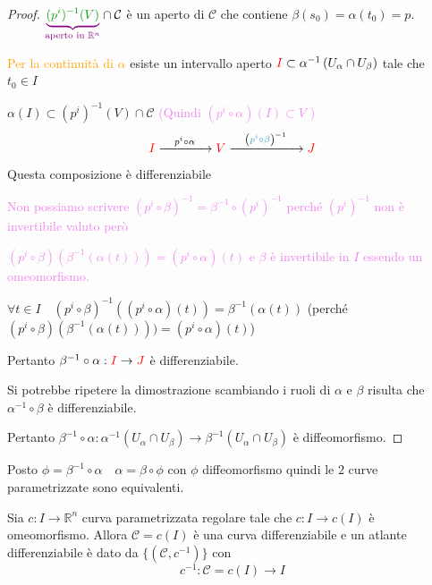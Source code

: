 \begin{proof}
        $\textcolor{violet}{\underbrace{\textcolor{verde}{(p^i)^{-1}(V)}}_{\text{aperto in } \mathbb{R}^n}} \cap \mathcal{C}$ è un aperto di $\mathcal{C}$ che contiene $\beta(s_0)=\alpha(t_0)=p$.

        \textcolor{orange}{Per la continuità di $\alpha$} esiste un intervallo aperto $\textcolor{red}{I} \subset \alpha^{-1} \left(U_\alpha \cap U_\beta \right)$ tale che
        $t_0 \in I$
        
        $\alpha(I) \subset (p^i)^{-1}(V) \cap \mathcal{C}$ \textcolor{violet}{(Quindi $\left(p^i \circ \alpha \right)(I) \subset V$ )}
        \[ \textcolor{red}{I} \xrightarrow[]{\quad p^i \circ \alpha \quad} \textcolor{red}{V} \xrightarrow[]{\quad \left( \textcolor{celeste}{p^i \circ \beta} \right)^{-1} \quad} \textcolor{red}{J} \]
        Questa composizione è differenziabile 

        \textcolor{violet}{Non possiamo scrivere $\left(p^i \circ \beta \right)^{-1} = \beta^{-1} \circ (p^i)^{-1}$ perché $(p^i)^{-1}$ non è 
        invertibile valuto però} 
        
        \textcolor{violet}{$(p^i \circ \beta)(\beta^{-1}(\alpha(t)))= (p^i \circ \alpha)(t)$ e $\beta$ è invertibile in $I$ essendo un omeomorfismo.}

        $\forall t \in I \quad \left(p^i \circ \beta \right)^{-1} \left( \left( p^i \circ \alpha \right) (t) \right) = \beta^{-1} \left( \alpha (t) \right)$
        \textcolor{blu}{(perché $\left(p^i \circ \beta \right) \left( \beta^{-1}(\alpha(t)) \right)) = \left(p^i \circ \alpha \right) (t)$)}

        Pertanto $\beta^{-1} \circ \alpha : \textcolor{red}{I} \to \textcolor{red}{J}$ è differenziabile.

        Si potrebbe ripetere la dimostrazione scambiando i ruoli di $\alpha$ e $\beta$ risulta che $\alpha^{-1} \circ \beta$ è differenziabile.

        Pertanto $\beta^{-1} \circ \alpha : \alpha^{-1} \left(U_{\alpha} \cap U_{\beta} \right) \to \beta^{-1} \left(U_{\alpha} \cap U_{\beta} \right)$ è diffeomorfismo.
        \end{proof}
        \begin{osservazione}
        Posto $\phi = \beta^{-1} \circ \alpha \quad \alpha = \beta \circ \phi$ con $\phi$ diffeomorfismo quindi le $2$ curve parametrizzate sono equivalenti. 
        \end{osservazione}
        \newpage
        \begin{esempio}
        Sia $c:I \to \mathbb{R}^n$ curva parametrizzata regolare tale che $c:I \to c(I)$ è omeomorfismo.
        Allora $\mathcal{C}=c(I)$ è una curva differenziabile e un atlante differenziabile è dato da $\{(\mathcal{C}, c^{-1})\}$ con
        \[ c^{-1}: \mathcal{C}= c(I) \to I \]
        \end{esempio}
